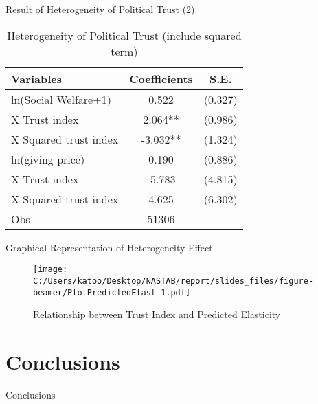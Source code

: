 \documentclass[
  ignorenonframetext,
]{beamer}
\begin{document}
\begin{frame}{Result of Heterogeneity of Political Trust (2)}
\protect\hypertarget{result-of-heterogeneity-of-political-trust-2}{}
\begin{table}

\caption{\label{tab:kableTabTrustHetero2Reg}Heterogeneity of Political Trust (include squared term)}
\centering
\begin{tabular}[t]{lcc}
\toprule
Variables & Coefficients & S.E.\\
\midrule
ln(Social Welfare+1) & 0.522 & (0.327)\\
\hspace{1em}X Trust index & 2.064** & (0.986)\\
\hspace{1em}X Squared trust index & -3.032** & (1.324)\\
ln(giving price) & 0.190 & (0.886)\\
\hspace{1em}X Trust index & -5.783 & (4.815)\\
\hspace{1em}X Squared trust index & 4.625 & (6.302)\\
Obs & 51306 & \\
\bottomrule
\end{tabular}
\end{table}
\end{frame}

\begin{frame}{Graphical Representation of Heterogeneity Effect}
\protect\hypertarget{graphical-representation-of-heterogeneity-effect}{}
\begin{figure}
\centering
\texttt{[image: C:/Users/katoo/Desktop/NASTAB/report/slides\_files/figure-beamer/PlotPredictedElast-1.pdf]}
\caption{Relationship between Trust Index and Predicted Elasticity}
\end{figure}
\end{frame}

\hypertarget{conclusions}{%
\section{Conclusions}\label{conclusions}}

\begin{frame}{Conclusions}
\protect\hypertarget{conclusions-1}{}
\end{frame}
\end{document}
